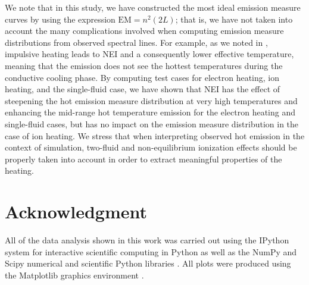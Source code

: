 \documentclass[apj]{emulateapj}
\begin{document}
	\par We note that in this study, we have constructed the most ideal emission measure curves by using the expression $\mathrm{EM}=n^2(2L)$; that is, we have not taken into account the many complications involved when computing emission measure distributions from observed spectral lines. For example, as we noted in , impulsive heating leads to NEI and a consequently lower effective temperature, meaning that the emission does not see the hottest temperatures during the conductive cooling phase. By computing test cases for electron heating, ion heating, and the single-fluid case, we have shown that NEI has the effect of steepening the hot emission measure distribution at very high temperatures and enhancing the mid-range hot temperature emission for the electron heating and single-fluid cases, but has no impact on the emission measure distribution in the case of ion heating. We stress that when interpreting observed hot emission in the context of simulation, two-fluid and non-equilibrium ionization effects should be properly taken into account in order to extract meaningful properties of the heating.
	\section*{Acknowledgment}
	All of the data analysis shown in this work was carried out using the IPython system for interactive scientific computing in Python as well as the NumPy and Scipy numerical and scientific Python libraries \citep{perez_ipython:_2007,van_der_walt_numpy_2011}. All plots were produced using the Matplotlib graphics environment \citep{hunter_matplotlib:_2007}.
	\appendix
\end{document}
